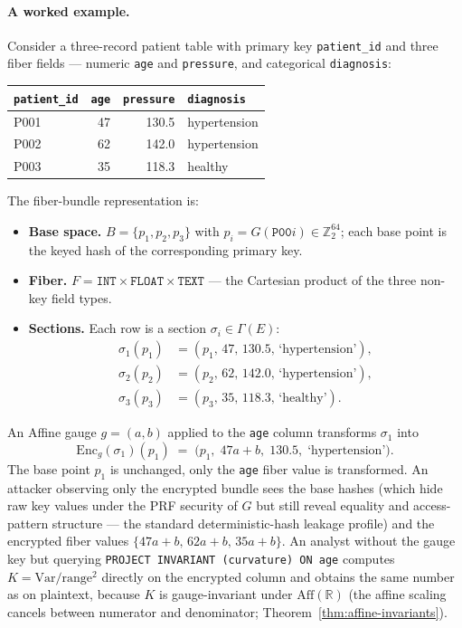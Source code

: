 \documentclass[11pt,letterpaper]{article}
\begin{document}
\paragraph{A worked example.}
Consider a three-record patient table with primary key
\texttt{patient\_id} and three fiber fields --- numeric
\texttt{age} and \texttt{pressure}, and categorical
\texttt{diagnosis}:
\begin{center}
\small
\begin{tabular}{lrrl}
\toprule
\texttt{patient\_id} & \texttt{age} & \texttt{pressure} & \texttt{diagnosis} \\
\midrule
P001 & 47 & 130.5 & hypertension \\
P002 & 62 & 142.0 & hypertension \\
P003 & 35 & 118.3 & healthy \\
\bottomrule
\end{tabular}
\end{center}
The fiber-bundle representation is:
\begin{itemize}[nosep,leftmargin=*]
\item \textbf{Base space.} $B = \{p_1, p_2, p_3\}$ with
  $p_i = G(\texttt{P00}i) \in \mathbb{Z}_2^{64}$; each base point is
  the keyed hash of the corresponding primary key.
\item \textbf{Fiber.} $F = \texttt{INT} \times \texttt{FLOAT}
  \times \texttt{TEXT}$ --- the Cartesian product of the three
  non-key field types.
\item \textbf{Sections.} Each row is a section
  $\sigma_i \in \Gamma(E)$:
  \[
  \begin{aligned}
  \sigma_1(p_1) &= (p_1,\, 47,\, 130.5,\, \text{`hypertension'}),\\
  \sigma_2(p_2) &= (p_2,\, 62,\, 142.0,\, \text{`hypertension'}),\\
  \sigma_3(p_3) &= (p_3,\, 35,\, 118.3,\, \text{`healthy'}).
  \end{aligned}
  \]
\end{itemize}
An Affine gauge $g = (a, b)$ applied to the \texttt{age} column
transforms $\sigma_1$ into
\[
\mathrm{Enc}_g(\sigma_1)(p_1) \;=\; \bigl(p_1,\; 47 a + b,\;
130.5,\; \text{`hypertension'}\bigr).
\]
The base point $p_1$ is unchanged, only the \texttt{age} fiber
value is transformed. An attacker observing only the encrypted
bundle sees the base hashes (which hide raw key values under
the PRF security of $G$ but still reveal equality and
access-pattern structure --- the standard deterministic-hash
leakage profile) and the encrypted fiber values
$\{47 a + b,\, 62 a + b,\, 35 a + b\}$. An analyst
without the gauge key but querying
\verb|PROJECT INVARIANT (curvature) ON age| computes
$K = \mathrm{Var}/\mathrm{range}^2$ directly on the encrypted
column and obtains the same number as on plaintext, because $K$
is gauge-invariant under $\mathrm{Aff}(\mathbb{R})$ (the affine
scaling cancels between numerator and denominator;
Theorem~\ref{thm:affine-invariants}).
\end{document}
